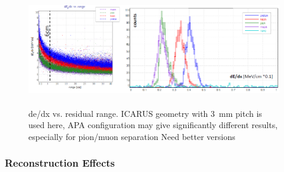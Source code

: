 \begin{figure}[h!]
  \centering
\includegraphics[width=\textwidth,height=5.0cm]{figures/pid_curves}
  \caption{de/dx vs. residual range.
ICARUS geometry with 3~mm pitch is used here, APA configuration may give significantly
different results, especially for pion/muon separation
{\color{red}
Need better versions 
}
}
\label{fig:resrange}
\end{figure}




\subsubsection{Reconstruction Effects}
\label{sec_reco}

